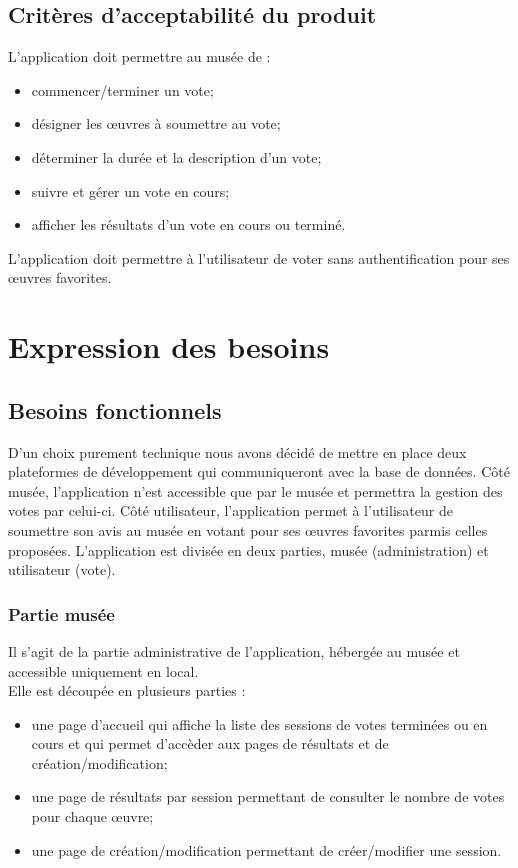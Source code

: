 \documentclass[a4paper]{article}
\begin{document}
\subsection{Critères d'acceptabilité du produit}
L’application doit permettre au musée de :
\begin{itemize}
\item commencer/terminer un vote;
\item désigner les œuvres à soumettre au vote;
\item déterminer la durée et la description d'un vote;
\item suivre et gérer un vote en cours;
\item afficher les résultats d'un vote en cours ou terminé.
\end{itemize}
L’application doit permettre à l'utilisateur de voter sans authentification pour ses œuvres favorites.
\newpage

\section{Expression des besoins}
\subsection{Besoins fonctionnels}
D'un choix purement technique nous avons décidé de mettre en place deux plateformes de développement qui communiqueront avec la base de données. Côté musée, l'application n'est accessible que par le musée et permettra la gestion des votes par celui-ci. Côté utilisateur, l’application permet à l'utilisateur de soumettre son avis au musée en votant pour ses œuvres favorites parmis celles proposées. L’application est divisée en deux parties, musée (administration) et utilisateur (vote).
\subsubsection{Partie musée}
Il s’agit de la partie administrative de l’application, hébergée au musée et accessible uniquement en local.\\
Elle est découpée en plusieurs parties :
\begin{itemize}
\item une page d'accueil qui affiche la liste des sessions de votes terminées ou en cours et qui permet d'accèder aux pages de résultats et de création/modification;
\item une page de résultats par session permettant de consulter le nombre de votes pour chaque œuvre;
\item une page de création/modification permettant de créer/modifier une session.
\end{itemize}
\end{document}
